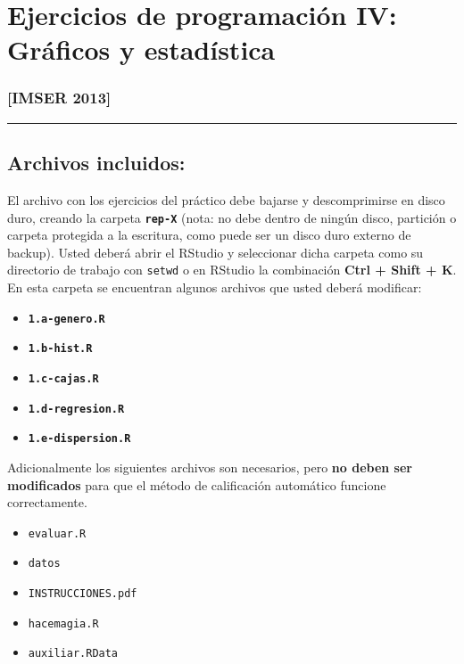 \documentclass[]{article}
\author{}
\date{}
\begin{document}
\section{Ejercicios de programación IV: Gráficos y estadística}

\subsubsection{{[}IMSER 2013{]}}

\begin{center}\rule{3in}{0.4pt}\end{center}

\subsection{Archivos incluidos:}

El archivo con los ejercicios del práctico debe bajarse y descomprimirse
en disco duro, creando la carpeta \textbf{\texttt{rep-X}} (nota: no debe
dentro de ningún disco, partición o carpeta protegida a la escritura,
como puede ser un disco duro externo de backup). Usted deberá abrir el
RStudio y seleccionar dicha carpeta como su directorio de trabajo con
\texttt{setwd} o en RStudio la combinación \textbf{Ctrl + Shift + K}. En
esta carpeta se encuentran algunos archivos que usted deberá modificar:

\begin{itemize}
\item
  \textbf{\texttt{1.a-genero.R}}
\item
  \textbf{\texttt{1.b-hist.R}}
\item
  \textbf{\texttt{1.c-cajas.R}}
\item
  \textbf{\texttt{1.d-regresion.R}}
\item
  \textbf{\texttt{1.e-dispersion.R}}
\end{itemize}

Adicionalmente los siguientes archivos son necesarios, pero \textbf{no
deben ser modificados} para que el método de calificación automático
funcione correctamente.

\begin{itemize}
\item
  \texttt{evaluar.R}
\item
  \texttt{datos}
\item
  \texttt{INSTRUCCIONES.pdf}
\item
  \texttt{hacemagia.R}
\item
  \texttt{auxiliar.RData}
\end{itemize}
\end{document}
